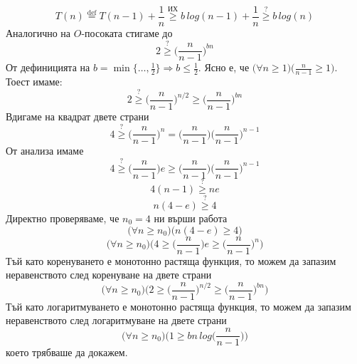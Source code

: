 \begin{solution}
\begin{itemize}
\begin{indstep}
			\begin{equation*}
				T(n)\overset{\text{def}}{=}T(n-1)+\frac1n\overset{\text{ИХ}}{\ge}b\,log(n-1)+\frac1n\overset{?}{\ge}b\,log(n)
			\end{equation*}
			Аналогично на $O$-посоката стигаме до
			\begin{equation*}
				2\overset{?}{\ge}\bigg(\frac{n}{n-1}\bigg)^{bn}
			\end{equation*}
			От дефиницията на $b\!=\!\min\{\dots,\frac12\}\Rightarrow b\le\frac12$. Ясно е, че $\big(\forall n\ge1\big)\big(\frac{n}{n-1}\ge1\big)$. Тоест имаме:
			\begin{equation*}
				2\overset{?}{\ge}\bigg(\frac{n}{n-1}\bigg)^{n/2}\ge\bigg(\frac{n}{n-1}\bigg)^{bn}
			\end{equation*}
			Вдигаме на квадрат двете страни
			\begin{equation*}
				4\overset{?}{\ge}\bigg(\frac{n}{n-1}\bigg)^n=\bigg(\frac{n}{n-1}\bigg)\bigg(\frac{n}{n-1}\bigg)^{n-1}
			\end{equation*}
			От анализа имаме
			\begin{equation*}
				4\overset{?}{\ge}\bigg(\frac{n}{n-1}\bigg)e\ge\bigg(\frac{n}{n-1}\bigg)\bigg(\frac{n}{n-1}\bigg)^{n-1}
			\end{equation*}
			\begin{equation*}
				4(n-1)\overset{?}{\ge}ne
			\end{equation*}
			\begin{equation*}
				n(4-e)\overset{?}{\ge}4
			\end{equation*}
			Директно проверяваме, че $n_0=4$ ни върши работа
			\begin{equation*}
				\big(\forall n\ge n_0\big)\big(n(4-e)\ge4\big)
			\end{equation*}
			\begin{equation*}
				\big(\forall n\ge n_0\big)\Bigg(4\ge\bigg(\frac{n}{n-1}\bigg)e\ge\bigg(\frac{n}{n-1}\bigg)^n\Bigg)
			\end{equation*}
			Тъй като коренуването е монотонно растяща функция, то можем да запазим неравенството след коренуване на двете страни
			\begin{equation*}
				\big(\forall n\ge n_0\big)\Bigg(2\ge\bigg(\frac{n}{n-1}\bigg)^{n/2}\ge\bigg(\frac{n}{n-1}\bigg)^{bn}\Bigg)
			\end{equation*}
			Тъй като логаритмуването е монотонно растяща функция, то можем да запазим неравенството след логаритмуване на двете страни
			\begin{equation*}
				\big(\forall n\ge n_0\big)\Bigg(1\ge bn\,log\bigg(\frac{n}{n-1}\bigg)\Bigg)
			\end{equation*}
			което трябваше да докажем.
		\end{indstep}
	\end{itemize}
\end{solution}

